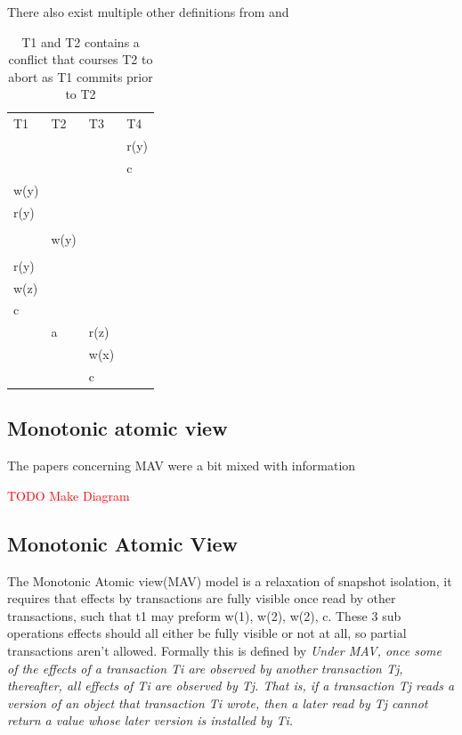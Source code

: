 \documentclass[a4paper,10pt,titlepage]{report}
\begin{document}
There also exist multiple other definitions from \cite{CeroneBernardiGotsman} and \cite{CrooksPuAlvisiClement}


\begin{table}[h]
\begin{tabular}{l|l|l|l}
T1   & T2   & T3   & T4   \\
     &      &      & r(y) \\
     &      &      & c    \\
w(y) &      &      &      \\
r(y) &      &      &      \\
     &      &      &      \\
     & w(y) &      &      \\
     &      &      &      \\
r(y) &      &      &      \\
w(z) &      &      &      \\
c    &      &      &      \\
     & a    & r(z) &      \\
     &      & w(x) &      \\
     &      & c    &      
\end{tabular}
\caption{T1 and T2 contains a conflict that courses T2 to abort as T1 commits prior to T2}
\end{table}

\subsection{Monotonic atomic view}
The papers concerning MAV were a bit mixed with information 



\textcolor{red}{TODO Make Diagram}

\subsection{Monotonic Atomic View}
The Monotonic Atomic view(MAV) model is a relaxation of snapshot isolation, it requires that effects by transactions are fully visible once read by other transactions, such that t1 may preform w(1), w(2), w(2), c. These 3 sub operations effects should all either be fully visible or not at all, so partial transactions aren't allowed. Formally this is defined by \cite{HighlyAvailableTransactionsVirtuesandLimitations}
\textit{Under MAV, once some of the effects of a transaction Ti are observed by another transaction Tj, thereafter, all effects of Ti are observed by Tj. That is, if a transaction Tj reads a version of an object that transaction Ti wrote, then a later read by Tj cannot return a value whose later version is installed by Ti.}
\end{document}
